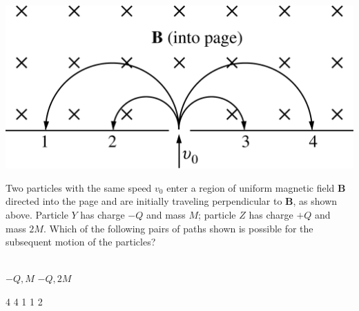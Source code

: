 \begin{center}
\includegraphics[scale=0.2]{images/img-004-003.png}
\end{center}

\begin{questions}\setcounter{question}{4}\question
Two particles with the same speed $v_{0}$ enter a region of uniform magnetic field $\mathbf{B}$ directed into the page and are initially traveling perpendicular to $\mathbf{B}$, as shown above. Particle $Y$ has charge $-Q$ and mass $M$; particle $Z$ has charge $+Q$ and mass $2 M$. Which of the following pairs of paths shown is possible for the subsequent motion of the particles?

\\
\tabto{0.75cm}\underline{$-Q, M$}
\tabto{4.00cm}\underline{$-Q, 2M$}

\begin{choices}
 \tabto{3.25cm} 4
 \tabto{3.25cm} 4
 \tabto{3.25cm} 1
 \tabto{3.25cm} 1
 \tabto{3.25cm} 2
\end{choices}\end{questions}

